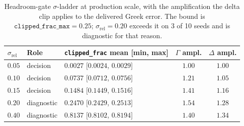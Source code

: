 \documentclass{article}
\begin{document}
\begin{table}[h]
\caption{Headroom-gate $\sigma$-ladder at production scale, with the amplification
the delta clip applies to the delivered Greek error. The bound is
$\texttt{clipped\_frac\_max} = 0.25$; $\sigma_{\mathrm{rel}} = 0.20$ exceeds it on
3 of 10 seeds and is diagnostic for that reason.}
\label{tab:ladder}
\centering\footnotesize\setlength{\tabcolsep}{5pt}
\begin{tabular}{@{}lllcc@{}}
\toprule
$\sigma_{\mathrm{rel}}$ & Role & \texttt{clipped\_frac} mean [min, max] & $\Gamma$ ampl. & $\Delta$ ampl. \\
\midrule
$0.05$ & decision & $0.0027$ [$0.0024$, $0.0029$] & $1.00$ & $1.00$ \\
$0.10$ & decision & $0.0737$ [$0.0712$, $0.0756$] & $1.21$ & $1.05$ \\
$0.15$ & decision & $0.1484$ [$0.1449$, $0.1516$] & $1.41$ & $1.16$ \\
$0.20$ & diagnostic & $0.2470$ [$0.2429$, $0.2513$] & $1.54$ & $1.28$ \\
$0.40$ & diagnostic & $0.8137$ [$0.8102$, $0.8194$] & $1.40$ & $1.34$ \\
\bottomrule
\end{tabular}
\end{table}

% 
\end{document}
